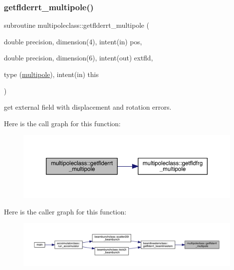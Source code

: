 \subsubsection{\texorpdfstring{getflderrt\_multipole()}{getflderrt\_multipole()}}
{\footnotesize\ttfamily subroutine multipoleclass\+::getflderrt\+\_\+multipole (\begin{DoxyParamCaption}\item[{double precision, dimension(4), intent(in)}]{pos,  }\item[{double precision, dimension(6), intent(out)}]{extfld,  }\item[{type (\mbox{\hyperlink{namespacemultipoleclass_structmultipoleclass_1_1multipole}{multipole}}), intent(in)}]{this }\end{DoxyParamCaption})}



get external field with displacement and rotation errors. 

Here is the call graph for this function\+:\nopagebreak
\begin{figure}[H]
\begin{center}
\leavevmode
\includegraphics[width=350pt]{namespacemultipoleclass_ab9a8281befade6912e33564f4db52877_cgraph}
\end{center}
\end{figure}
Here is the caller graph for this function\+:\nopagebreak
\begin{figure}[H]
\begin{center}
\leavevmode
\includegraphics[width=350pt]{namespacemultipoleclass_ab9a8281befade6912e33564f4db52877_icgraph}
\end{center}
\end{figure}
\mbox{\label{namespacemultipoleclass_a8712b7622d8ed7c0e71cdc18204dcf46}} 
